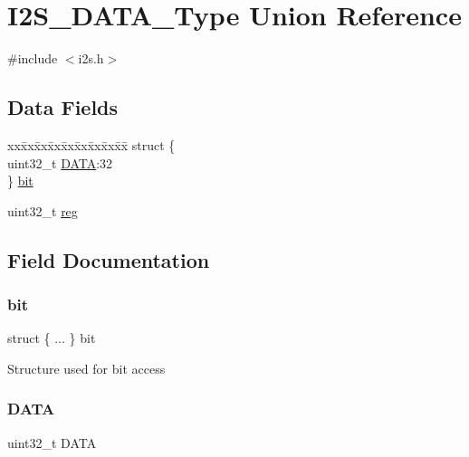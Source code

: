 \hypertarget{union_i2_s___d_a_t_a___type}{}\section{I2\+S\+\_\+\+D\+A\+T\+A\+\_\+\+Type Union Reference}
\label{union_i2_s___d_a_t_a___type}


{\ttfamily \#include $<$i2s.\+h$>$}

\subsection*{Data Fields}
\begin{DoxyCompactItemize}
\item 
\begin{tabbing}
xx\=xx\=xx\=xx\=xx\=xx\=xx\=xx\=xx\=\kill
struct \{\\
\>uint32\_t \mbox{\hyperlink{union_i2_s___d_a_t_a___type_aad20077939fb7b9e145416f55028ea37}{DATA}}:32\\
\} \mbox{\hyperlink{union_i2_s___d_a_t_a___type_a2380b122e60a6ccacbcd584b9720c0f0}{bit}}\\

\end{tabbing}\item 
uint32\+\_\+t \mbox{\hyperlink{union_i2_s___d_a_t_a___type_a6b91636401516a477989a336376d7b40}{reg}}
\end{DoxyCompactItemize}


\subsection{Field Documentation}
\mbox{\label{union_i2_s___d_a_t_a___type_a2380b122e60a6ccacbcd584b9720c0f0}} 
\subsubsection{\texorpdfstring{bit}{bit}}
{\footnotesize\ttfamily struct \{ ... \}   bit}

Structure used for bit access \mbox{\label{union_i2_s___d_a_t_a___type_aad20077939fb7b9e145416f55028ea37}} 
\subsubsection{\texorpdfstring{DATA}{DATA}}
{\footnotesize\ttfamily uint32\+\_\+t D\+A\+TA}

